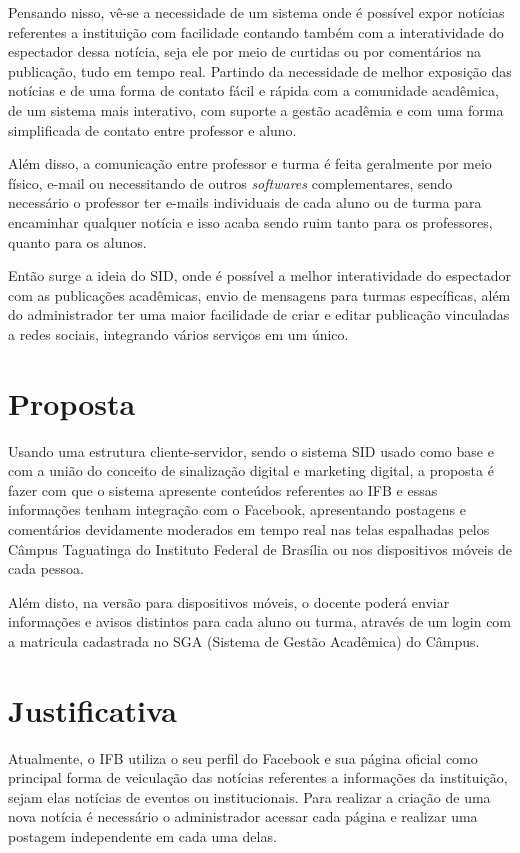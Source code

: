 Pensando nisso, vê-se a necessidade de um sistema onde é possível expor notícias referentes a instituição com facilidade contando também com a interatividade do espectador dessa notícia, seja ele por meio de curtidas ou por comentários na publicação, tudo em tempo real. Partindo da necessidade de melhor exposição das notícias e de uma forma de contato fácil e rápida com a comunidade acadêmica, de um sistema mais interativo, com suporte a gestão acadêmia e com uma forma simplificada de contato entre professor e aluno. 

Além disso, a comunicação entre professor e turma é feita geralmente por meio físico, e-mail ou necessitando de outros \textit{softwares} complementares, sendo necessário o professor ter e-mails individuais de cada aluno ou de turma para encaminhar qualquer notícia e isso acaba sendo ruim tanto para os professores, quanto para os alunos. 

Então surge a ideia do SID, onde é possível a melhor interatividade do espectador com as publicações acadêmicas, envio de mensagens para turmas específicas, além do administrador ter uma maior facilidade de criar e editar publicação vinculadas a redes sociais, integrando vários serviços em um único.

\section{Proposta}
Usando uma estrutura cliente-servidor, sendo o sistema SID usado como base e com a união do conceito de sinalização digital e marketing digital, a proposta é fazer com que o sistema apresente conteúdos referentes ao IFB e essas informações tenham integração com o Facebook, apresentando postagens e comentários devidamente moderados em tempo real nas  telas espalhadas pelos Câmpus Taguatinga do Instituto Federal de Brasília ou nos dispositivos móveis de cada pessoa. 

Além disto, na versão para dispositivos móveis, o docente poderá enviar informações e avisos distintos para cada aluno ou turma, através de um login com a matricula cadastrada no SGA (Sistema de Gestão Acadêmica) do Câmpus.

\section{Justificativa}
Atualmente, o IFB utiliza o seu perfil do Facebook e sua página oficial como principal forma de veiculação das notícias referentes a informações da instituição, sejam elas notícias de eventos ou institucionais. Para realizar a criação de uma nova notícia é necessário o administrador acessar cada página e realizar uma postagem independente em cada uma delas. 

